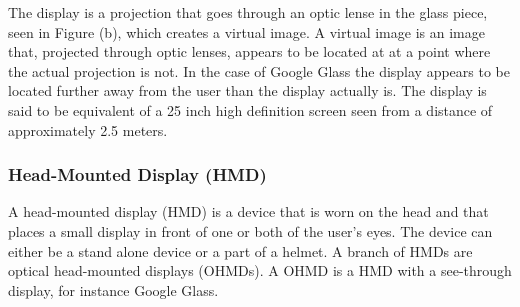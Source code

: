 The display is a projection that goes through an optic lense in the glass piece, seen in Figure \label{GoogleGlassHardware} (b), which creates a virtual image. A virtual image is an image that, projected through optic lenses, appears to be located at at a point where the actual projection is not.\cite{virtualImageWiki} In the case of Google Glass the display appears to be located further away from the user than the display actually is. The display is said to be equivalent of a 25 inch high definition screen seen from a distance of approximately 2.5 meters.\cite{GlassSpecs}

%
%
%
%
%
%
%
%	
%	
%	
%
%
%
%
%
%
%
%
\subsubsection{Head-Mounted Display (HMD)}
\label{subsubsec:hmd}
A head-mounted display (HMD)\cite{hmdWiki} is a device that is worn on the head and that places a small display in front of one or both of the user's eyes. The device can either be a stand alone device or a part of a helmet. A branch of HMDs are optical head-mounted displays (OHMDs)\cite{ohmdWiki}. A OHMD is a HMD with a see-through display, for instance Google Glass.

